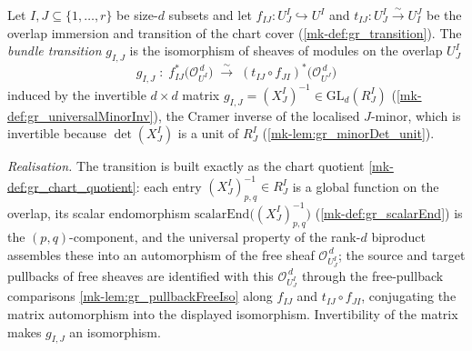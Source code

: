 \begin{definition}\label{mk-def:gr_bundleTransition}
  \leanok

  Let \(I, J \subseteq \{1,\dots,r\}\) be size-\(d\) subsets and let
  \(f_{IJ} : U^I_J \hookrightarrow U^I\) and \(t_{IJ} : U^I_J \xrightarrow{\sim} U^J_I\) be
  the overlap immersion and transition of the chart cover (\ref{mk-def:gr_transition}). The
  \emph{bundle transition} \(g_{I,J}\) is the isomorphism of sheaves of modules on the
  overlap \(U^I_J\)
  \[
    g_{I,J} \;:\;
      f_{IJ}^{*}\bigl(\mathcal{O}_{U^I}^{\,d}\bigr)
      \;\xrightarrow{\ \sim\ }\;
      (t_{IJ} \circ f_{JI})^{*}\bigl(\mathcal{O}_{U^J}^{\,d}\bigr)
  \]
  induced by the invertible \(d \times d\) matrix
  \(g_{I,J} = (X^I_J)^{-1} \in \mathrm{GL}_d(R^I_J)\) (\ref{mk-def:gr_universalMinorInv}),
  the Cramer inverse of the localised \(J\)-minor, which is invertible because
  \(\det(X^I_J)\) is a unit of \(R^I_J\) (\ref{mk-lem:gr_minorDet_unit}).

  \emph{Realisation.} The transition is built exactly as the chart quotient
  \ref{mk-def:gr_chart_quotient}: each entry \((X^I_J)^{-1}_{p,q} \in R^I_J\) is a global
  function on the overlap, its scalar endomorphism
  \(\mathrm{scalarEnd}\bigl((X^I_J)^{-1}_{p,q}\bigr)\) (\ref{mk-def:gr_scalarEnd}) is the
  \((p,q)\)-component, and the universal property of the rank-\(d\) biproduct assembles
  these into an automorphism of the free sheaf \(\mathcal{O}_{U^I_J}^{\,d}\); the
  source and target pullbacks of free sheaves are identified with this
  \(\mathcal{O}_{U^I_J}^{\,d}\) through the free-pullback comparisons
  \ref{mk-lem:gr_pullbackFreeIso} along \(f_{IJ}\) and \(t_{IJ} \circ f_{JI}\), conjugating
  the matrix automorphism into the displayed isomorphism. Invertibility of the matrix makes
  \(g_{I,J}\) an isomorphism.
\end{definition}

